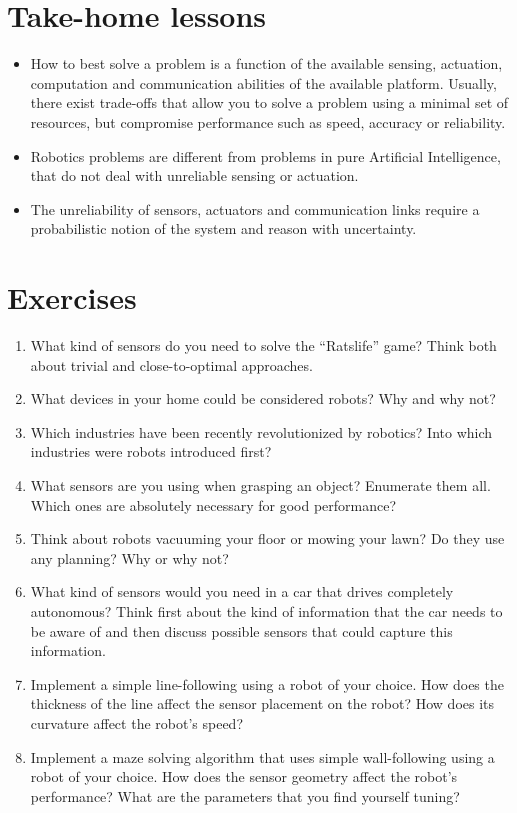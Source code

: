 \section*{Take-home lessons}
\begin{itemize}
\item How to best solve a problem is a function of the available sensing, actuation, computation and communication abilities of the available platform. Usually, there exist trade-offs that allow you to solve a problem using a minimal set of resources, but compromise performance such as speed, accuracy or reliability.
\item Robotics problems are different from problems in pure Artificial Intelligence, that do not deal with unreliable sensing or actuation.
\item The unreliability of sensors, actuators and communication links require a probabilistic notion of the system and reason with uncertainty.
\end{itemize}

\section*{Exercises}\small
\begin{enumerate}
\item What kind of sensors do you need to solve the ``Ratslife'' game? Think both about trivial and close-to-optimal approaches.
\item What devices in your home could be considered robots? Why and why not?
\item Which industries have been recently revolutionized by robotics? Into which industries were robots introduced first?
\item What sensors are you using when grasping an object? Enumerate them all. Which ones are absolutely necessary for good performance?
\item Think about robots vacuuming your floor or mowing your lawn? Do they use any planning? Why or why not?
\item What kind of sensors would you need in a car that drives completely autonomous? Think first about the kind of information that the car needs to be aware of and then discuss possible sensors that could capture this information.
\item Implement a simple line-following using a robot of your choice. How does the thickness of the line affect the sensor placement on the robot? How does its curvature affect the robot's speed?
\item Implement a maze solving algorithm that uses simple wall-following using a robot of your choice. How does the sensor geometry affect the robot's performance? What are the parameters that you find yourself tuning? 
\end{enumerate}\normalsize

